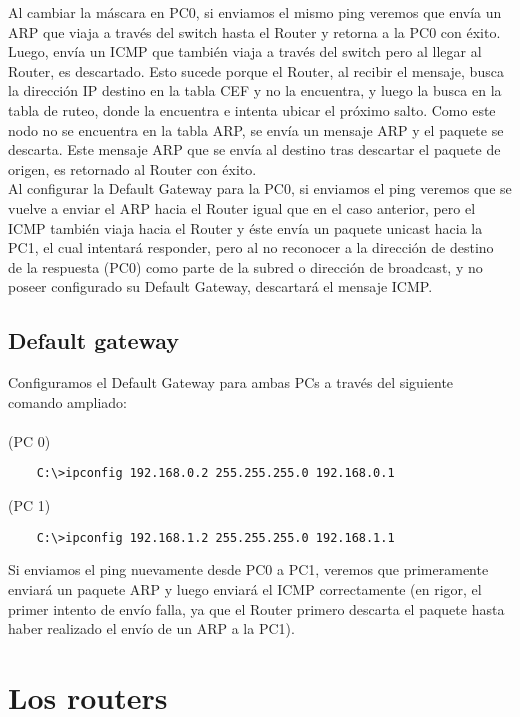 \documentclass{article}
\begin{document}
Al cambiar la m\'ascara en PC0, si enviamos el mismo ping veremos que env\'ia un ARP que viaja a trav\'es del switch hasta el Router y retorna a la PC0 con \'exito. Luego, env\'ia un ICMP que tambi\'en viaja a trav\'es del switch pero al llegar al Router, es descartado. Esto sucede porque el Router, al recibir el mensaje, busca la direcci\'on IP destino en la tabla CEF y no la encuentra, y luego la busca en la tabla de ruteo, donde la encuentra e intenta ubicar el pr\'oximo salto. Como este nodo no se encuentra en la tabla ARP, se env\'ia un mensaje ARP y el paquete se descarta. Este mensaje ARP que se env\'ia al destino tras descartar el paquete de origen, es retornado al Router con \'exito. \\

Al configurar la Default Gateway para la PC0, si enviamos el ping veremos que se vuelve a enviar el ARP hacia el Router igual que en el caso anterior, pero el ICMP tambi\'en viaja hacia el Router y \'este env\'ia un paquete unicast hacia la PC1, el cual intentar\'a responder, pero al no reconocer a la direcci\'on de destino de la respuesta (PC0) como parte de la subred o direcci\'on de broadcast, y no poseer configurado su Default Gateway, descartar\'a el mensaje ICMP. \\

\subsection{Default gateway}
Configuramos el Default Gateway para ambas PCs a trav\'es del siguiente comando ampliado: \\\\
(PC 0)
\begin{verbatim}
    C:\>ipconfig 192.168.0.2 255.255.255.0 192.168.0.1
\end{verbatim}
(PC 1)
\begin{verbatim}
    C:\>ipconfig 192.168.1.2 255.255.255.0 192.168.1.1
\end{verbatim}

Si enviamos el ping nuevamente desde PC0 a PC1, veremos que primeramente enviar\'a un paquete ARP y luego enviar\'a el ICMP correctamente (en rigor, el primer intento de env\'io falla, ya que el Router primero descarta el paquete hasta haber realizado el env\'io de un ARP a la PC1). \\

\section{Los routers}
\end{document}
